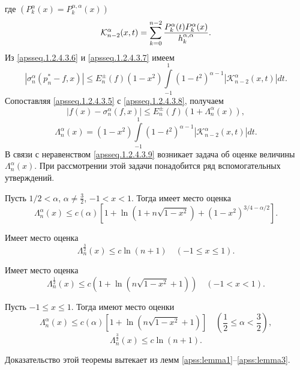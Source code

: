 где $(P_k^\alpha(x)=P_k^{\alpha,\alpha}(x))$
\begin{equation}\label{apsseq.1.2.4.3.7}
\mathcal{K}_{n-2}^\alpha(x,t)=\sum_{k=0}^{n-2}{P_k^\alpha(t)P_k^\alpha(x)\over h_k^{\alpha,\alpha}}.
\end{equation}
Из \eqref{apsseq.1.2.4.3.6} и \eqref{apsseq.1.2.4.3.7} имеем
\begin{equation}\label{apsseq.1.2.4.3.8}
|\sigma_n^\alpha(p_n^*-f,x)|\le E_n^\pm(f)(1-x^2)\int\limits_{-1}^1(1-t^2)^{\alpha-1}|\mathcal{K}_{n-2}^\alpha(x,t)|dt.
\end{equation}
Сопоставляя \eqref{apsseq.1.2.4.3.5} с \eqref{apsseq.1.2.4.3.8}, получаем
\begin{equation}\label{apsseq.1.2.4.3.9}
|f(x)-\sigma_n^\alpha(f,x)|\le E_n^\pm(f)(1+\Lambda_n^\alpha(x)),
\end{equation}
\begin{equation}\label{apsseq.1.2.4.3.10}
\Lambda_n^\alpha(x)=(1-x^2)\int\limits_{-1}^1(1-t^2)^{\alpha-1}|\mathcal{ K}_{n-2}^\alpha(x,t)|dt.
\end{equation}
В связи с неравенством \eqref{apsseq.1.2.4.3.9} возникает задача об оценке величины $\Lambda_n^\alpha(x)$. При рассмотрении этой задачи понадобится ряд
вспомогательных утверждений.

\begin{lemma}\label{apss:lemma1} Пусть $1/2<\alpha$, $\alpha\ne\frac32$, $-1< x< 1$. Тогда имеет место оценка
$$
\Lambda_n^\alpha(x)\le c(\alpha)\left[1+\ln(1+n\sqrt{1-x^2})+(1-x^2)^{3/4-\alpha/2}\right].
$$
\end{lemma}
\begin{lemma}\label{apss:lemma2} Имеет место оценка
$$\Lambda_n^{\frac32}(x)\le c\ln(n+1)\quad(-1\le x\le1).$$
\end{lemma}

\begin{lemma}\label{apss:lemma3} Имеет место оценка
$$\Lambda^\frac12_n(x)\le c(1+\ln(n\sqrt{1-x^2}+1))\quad(-1<x<1).$$
\end{lemma}

\begin{theorem}\label{apss:t1} Пусть $-1\le x\le1$. Тогда имеют место оценки
$$\Lambda^\alpha_n(x)\le c(\alpha)[1+\ln(n\sqrt{1-x^2}+1)]\quad(\frac12\le\alpha<\frac32),$$
$$\Lambda^{\frac32}_n(x)\le c\ln(n+1).$$
\end{theorem}

\noindent Доказательство этой теоремы вытекает из лемм \ref{apss:lemma1}--\ref{apss:lemma3}.


